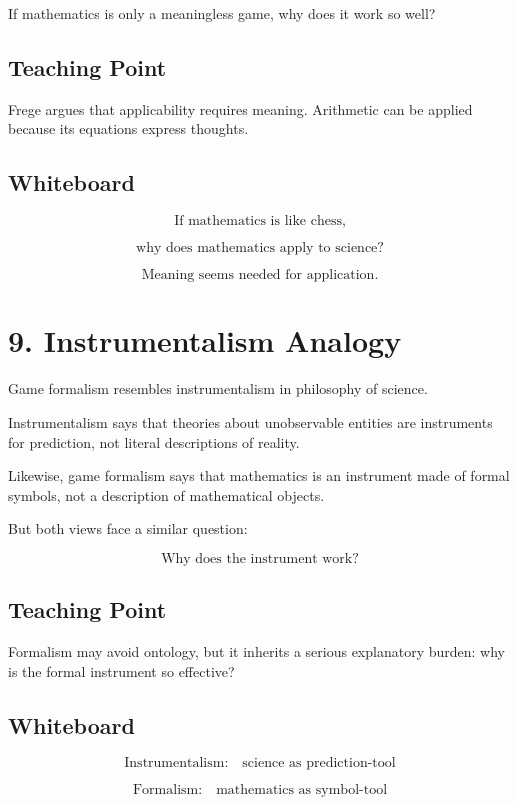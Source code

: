 \documentclass[11pt]{article}
\begin{document}
If mathematics is only a meaningless game, why does it work so well?

\subsection*{Teaching Point}

Frege argues that applicability requires meaning. Arithmetic can be applied because its
equations express thoughts.

\subsection*{Whiteboard}

\[
\text{If mathematics is like chess,}
\]

\[
\text{why does mathematics apply to science?}
\]

\[
\boxed{
\text{Meaning seems needed for application.}
}
\]

\section*{9. Instrumentalism Analogy}

Game formalism resembles instrumentalism in philosophy of science.

Instrumentalism says that theories about unobservable entities are instruments for
prediction, not literal descriptions of reality.

Likewise, game formalism says that mathematics is an instrument made of formal
symbols, not a description of mathematical objects.

But both views face a similar question:

\[
\text{Why does the instrument work?}
\]

\subsection*{Teaching Point}

Formalism may avoid ontology, but it inherits a serious explanatory burden: why is the
formal instrument so effective?

\subsection*{Whiteboard}

\[
\text{Instrumentalism:}
\quad
\text{science as prediction-tool}
\]

\[
\text{Formalism:}
\quad
\text{mathematics as symbol-tool}
\]
\end{document}
